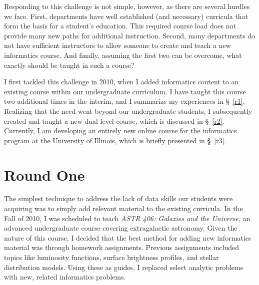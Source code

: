 \documentclass[11pt,twoside]{article}
\begin{document}
Responding to this challenge is not simple, however, as there are several hurdles we face. First, departments have well established (and necessary) curricula that form the basis for a student's education. This required course load does not provide many new paths for additional instruction. Second, many departments do not have sufficient instructors to allow someone to create and teach a new informatics course. And finally, assuming the first two can be overcome, what exactly should be taught in such a course?

I first tackled this challenge in 2010, when I added informatics content to an existing course within our undergraduate curriculum. I have taught this course two additional times in the interim, and I summarize my experiences in \S~\ref{r1}. Realizing that the need went beyond our undergraduate students, I subsequently created and taught a new dual level course, which is discussed in \S~\ref{r2}. Currently, I am developing an entirely new online course for the informatics program at the University of Illinois, which is briefly presented in \S~\ref{r3}.

\section{Round One~\label{r1}}

The simplest technique to address the lack of data skills our students were acquiring was to simply add relevant material to the existing curricula. In the Fall of 2010,  I was scheduled to teach \textit{ASTR 406: Galaxies and the Universe}, an advanced undergraduate course covering extragalactic astronomy. Given the nature of this course, I decided that the best method for adding new informatics material was through homework assignments. Previous assignments included topics like luminosity functions, surface brightness profiles, and stellar distribution models. Using these as guides, I replaced select analytic problems with new, related informatics problems.

\end{document}
